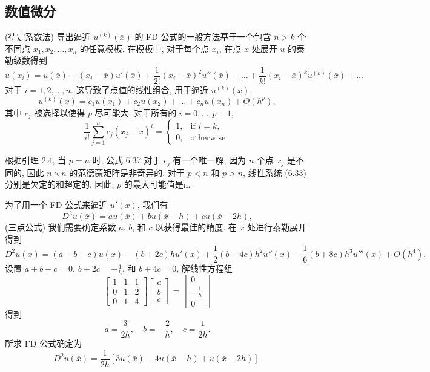 \documentclass[a4paper]{ctexart}
\newcommand{\hl}[1]
{\noindent {\bf {#1}}}
\begin{document}
\subsection{数值微分}

\hl{公式 6.37} (待定系数法) 导出逼近 $u^{(k)}(\bar{x})$ 的 FD 
公式的一般方法基于一个包含 $n > k$ 个不同点 $x_1, x_2, \ldots, x_n$ 的任意模板. 
在模板中, 对于每个点 $x_i$, 在点 $\bar{x}$ 处展开 $u$ 的泰勒级数得到
$$
u(x_i) = u(\bar{x}) + (x_i - \bar{x})u'(\bar{x}) 
+ \frac{1}{2!}(x_i - \bar{x})^2u''(\bar{x}) + \ldots 
+ \frac{1}{k!}(x_i - \bar{x})^ku^{(k)}(\bar{x}) + \ldots
$$
对于 $i = 1, 2, \ldots, n$. 
这导致了点值的线性组合, 用于逼近 $u^{(k)}(\bar{x})$, 
$$
u^{(k)}(\bar{x}) = c_1u(x_1) + c_2u(x_2) + \ldots + c_nu(x_n) + O(h^p),
$$
其中 $c_j$ 被选择以使得 $p$ 尽可能大:
对于所有的 $i = 0, \ldots, p - 1$, 
$$
\frac{1}{i!} \sum_{j = 1}^{n}c_j (x_j - \bar{x})^i 
= \begin{cases} 1, & \text{if } i = k, \\ 0, & \text{otherwise}.\end{cases}
$$

根据引理 2.4, 当 $p = n$ 时, 公式 6.37 对于 $c_j$ 有一个唯一解, 
因为 $n$ 个点 $x_j$ 是不同的, 因此 $n \times n$ 的范德蒙矩阵是非奇异的. 
对于 $p < n$ 和 $p > n$, 线性系统 (6.33) 分别是欠定的和超定的. 因此, $p$ 的最大可能值是n. 

\hl{Example 6.38} 为了用一个 FD 公式来逼近 $u'(\bar{x})$, 我们有
$$
D^2 u(\bar{x}) = a u(\bar{x}) + b u(\bar{x} - h) + c u(\bar{x} - 2h),
$$
(三点公式) 我们需要确定系数 $a$, $b$, 和 $c$ 以获得最佳的精度. 
在 $\bar{x}$ 处进行泰勒展开得到
$$
D^2u(\bar{x}) = (a + b + c) u(\bar{x}) - (b + 2c)h u'(\bar{x}) 
+ \frac{1}{2}(b + 4c)h^2u''(\bar{x}) 
- \frac{1}{6}(b + 8c)h^3u'''(\bar{x}) + O(h^4).
$$
设置 $a + b + c = 0$, $b + 2c = -\frac{1}{h}$, 和 $b + 4c = 0$, 
解线性方程组
$$
\begin{bmatrix}
1 & 1 & 1 \\
0 & 1 & 2 \\
0 & 1 & 4
\end{bmatrix}
\begin{bmatrix}
a \\
b \\
c
\end{bmatrix}
=
\begin{bmatrix}
0 \\
-\frac{1}{h} \\
0
\end{bmatrix}
$$
得到
$$
a = \frac{3}{2h}, \quad b = -\frac{2}{h}, \quad c = \frac{1}{2h}. 
$$
所求 FD 公式确定为
$$
D^2u(\bar{x}) = \frac{1}{2h}[3u(\bar{x}) - 4u(\bar{x} - h) + u(\bar{x} - 2h)]. 
$$
\end{document}
